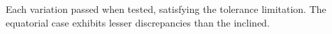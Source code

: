 \begin{itemize}
\begin{enumerate}
		Each variation passed when tested, satisfying the tolerance limitation. The equatorial case exhibits lesser discrepancies than the inclined. %
	\end{enumerate}
\end{itemize}
\pagebreak